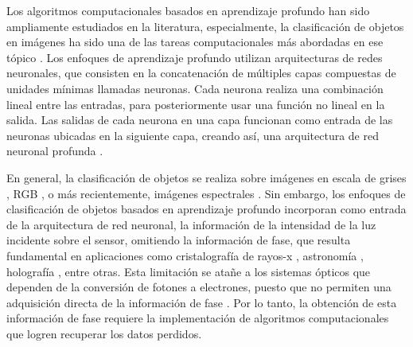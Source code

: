

Los algoritmos computacionales basados en aprendizaje profundo han sido ampliamente estudiados en la literatura, especialmente, la clasificación de objetos en imágenes ha sido una de las tareas computacionales más abordadas en ese tópico \cite{li2019deep,li2018deep, wang2019development}. Los enfoques de aprendizaje profundo utilizan arquitecturas de redes neuronales, que consisten en la concatenación de múltiples capas compuestas de unidades mínimas llamadas neuronas. Cada neurona realiza una combinación lineal entre las entradas, para posteriormente usar una función no lineal en la salida. Las salidas de cada neurona en una capa funcionan como entrada de las neuronas ubicadas en la siguiente capa, creando así, una arquitectura de red neuronal profunda \cite{fan2019selective}. 

En general, la clasificación de objetos se realiza sobre imágenes en escala de grises \cite{bui2016using}, RGB \cite{krizhevsky2017imagenet}, o más recientemente, imágenes espectrales \cite{li2019deep}. Sin embargo, los enfoques de clasificación de objetos basados en aprendizaje profundo incorporan como entrada de la arquitectura de red neuronal, la información de la intensidad de la luz incidente sobre el sensor, omitiendo la información de fase, que resulta fundamental en aplicaciones como cristalografía de rayos-x \cite{pinilla2018coded}, astronomía \cite{fienup1987phase}, holografía \cite{rivenson2018phase}, entre otras. Esta limitación se atañe a los sistemas ópticos que dependen de la conversión de fotones a electrones, puesto que no permiten una adquisición directa de la información de fase \cite{shechtman2015phase}. Por lo tanto, la obtención de esta información de fase requiere la implementación de algoritmos computacionales que logren recuperar los datos perdidos.

